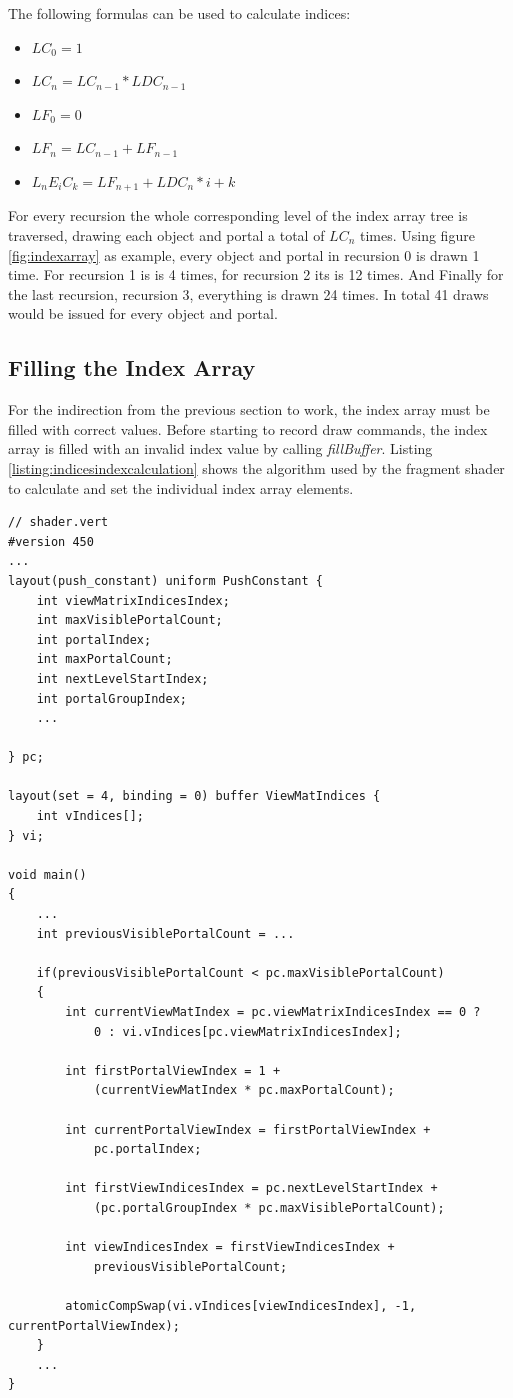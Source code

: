 The following formulas can be used to calculate indices:

\begin{itemize}
	\item $LC_0 = 1$
	\item $LC_n = LC_{n-1} * LDC_{n-1}$
	\item $LF_0 = 0$
	\item $LF_n = LC_{n-1} + LF_{n-1}$
	\item $L_nE_iC_k = LF_{n+1} + LDC_{n} * i + k$
\end{itemize}

For every recursion the whole corresponding level of the index array tree is traversed, drawing each object and portal a total of $LC_n$ times. Using figure \ref{fig:indexarray} as example, every object and portal in recursion 0 is drawn 1 time. For recursion 1 is is 4 times, for recursion 2 its is 12 times. And Finally for the last recursion, recursion 3, everything is drawn 24 times. In total 41 draws would be issued for every object and portal.

\subsection{Filling the Index Array}
For the indirection from the previous section to work, the index array must be filled with correct values. Before starting to record draw commands, the index array is filled with an invalid index value by calling \textit{fillBuffer}. Listing \ref{listing:indicesindexcalculation} shows the algorithm used by the fragment shader to calculate and set the individual index array elements.

\begin{lstlisting}[caption={Calculating Indices Index}, label=listing:indicesindexcalculation]
// shader.vert
#version 450
...
layout(push_constant) uniform PushConstant {	
	int viewMatrixIndicesIndex;
	int maxVisiblePortalCount;
	int portalIndex;
	int maxPortalCount;
	int nextLevelStartIndex;
	int portalGroupIndex;
	...

} pc;

layout(set = 4, binding = 0) buffer ViewMatIndices {
	int vIndices[];
} vi;

void main()
{
	...
	int previousVisiblePortalCount = ...
	
	if(previousVisiblePortalCount < pc.maxVisiblePortalCount)
	{
		int currentViewMatIndex = pc.viewMatrixIndicesIndex == 0 ? 
			0 : vi.vIndices[pc.viewMatrixIndicesIndex];
		
		int firstPortalViewIndex = 1 +
			(currentViewMatIndex * pc.maxPortalCount);
		
		int currentPortalViewIndex = firstPortalViewIndex +
			pc.portalIndex;
		
		int firstViewIndicesIndex = pc.nextLevelStartIndex +
			(pc.portalGroupIndex * pc.maxVisiblePortalCount);
			
		int viewIndicesIndex = firstViewIndicesIndex +
			previousVisiblePortalCount;
			
		atomicCompSwap(vi.vIndices[viewIndicesIndex], -1, currentPortalViewIndex);
	}
	...	
}

\end{lstlisting}

